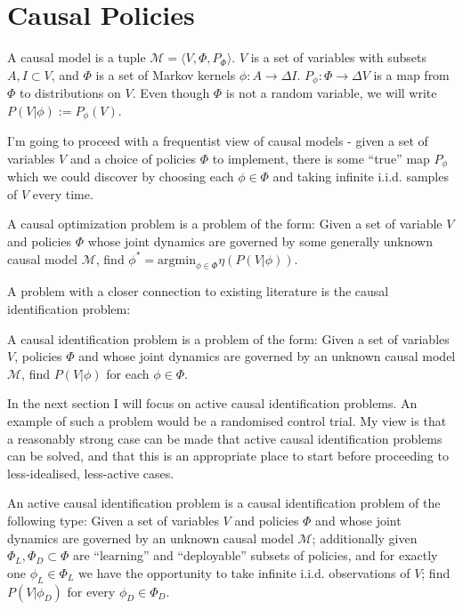 \section{Causal Policies}

\begin{definition}
A causal model is a tuple $\mathcal{M} = \langle V, \Phi, P_\Phi \rangle$. $V$ is a set of variables with subsets $A, I\subset V$, and $\Phi$ is a set of Markov kernels $\phi:A\to \Delta I$. $P_\phi : \Phi\to \Delta V$ is a map from $\Phi$ to distributions on $V$. Even though $\Phi$ is not a random variable, we will write $P(V|\phi) := P_\phi(V)$.
\end{definition}

I'm going to proceed with a frequentist view of causal models - given a set of variables $V$ and a choice of policies $\Phi$ to implement, there is some ``true'' map $P_\phi$ which we could discover by choosing each $\phi\in \Phi$ and taking infinite i.i.d. samples of $V$ every time.

\begin{definition}\label{def:2s_copt_prob}
A causal optimization problem is a problem of the form: Given a set of variable $V$ and policies $\Phi$ whose joint dynamics are governed by some generally unknown causal model $\mathcal{M}$, find $\phi^* = \mathrm{argmin}_{\phi\in\Phi} \eta(P(V|\phi))$.
\end{definition}

A problem with a closer connection to existing literature is the causal identification problem:

\begin{definition}\label{def:causal_ident_prob}
A causal identification problem is a problem of  the form: Given a set of variables $V$, policies $\Phi$ and  whose joint dynamics are governed by an unknown causal model $\mathcal{M}$, find $P(V|\phi)$ for each $\phi\in \Phi$.
\end{definition}

In the next section I will focus on active causal identification problems. An example of such a problem would be a randomised control trial. My view is that a reasonably strong case can be made that active causal identification problems can be solved, and that this is an appropriate place to start before proceeding to less-idealised, less-active cases.

\begin{definition}
An active causal identification problem is a causal identification problem of the following type: Given a set of variables $V$ and policies $\Phi$ and  whose joint dynamics are governed by an unknown causal model $\mathcal{M}$; additionally given $\Phi_L, \Phi_D\subset \Phi$ are ``learning'' and ``deployable'' subsets of policies, and for exactly one $\phi_L\in \Phi_L$ we have the opportunity to take infinite i.i.d. observations of $V$; find $P(V|\phi_D)$ for every $\phi_D\in\Phi_D$.
\end{definition}

